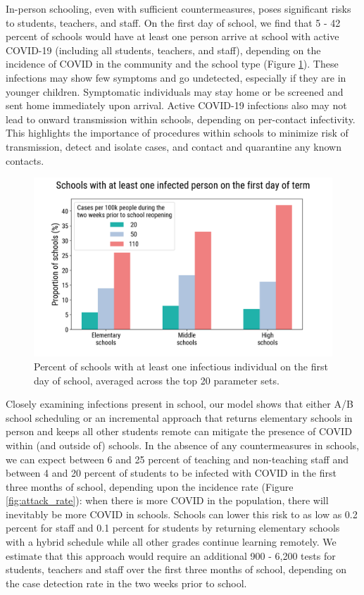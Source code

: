 \documentclass[preprint,12pt]{elsarticle}
\begin{document}
In-person schooling, even with sufficient countermeasures, poses significant risks to students, teachers, and staff. On the first day of school, we find that 5 - 42 percent of schools would have at least one person arrive at school with active COVID-19 (including all students, teachers, and staff), depending on the incidence of COVID in the community and the school type (Figure \ref{fig:schools_with_a_case}). These infections may show few symptoms and go undetected, especially if they are in younger children. Symptomatic individuals may stay home or be screened and sent home immediately upon arrival. Active COVID-19 infections also may not lead to onward transmission within schools, depending on per-contact infectivity. This highlights the importance of procedures within schools to minimize risk of transmission, detect and isolate cases, and contact and quarantine any known contacts. 

\begin{figure}[h]
    \centering
    \includegraphics[scale=0.5]{schools_with_a_case_2020-08-05.png}
    \caption{Percent of schools with at least one infectious individual on the first day of school, averaged across the top 20 parameter sets.}
    \label{fig:schools_with_a_case}
\end{figure}

Closely examining infections present in school, our model shows that either A/B school scheduling or an incremental approach that returns elementary schools in person and keeps all other students remote can mitigate the presence of COVID within (and outside of) schools. In the absence of any countermeasures in schools, we can expect between 6 and 25 percent of teaching and non-teaching staff and between 4 and 20 percent of students to be infected with COVID in the first three months of school, depending upon the incidence rate (Figure \ref{fig:attack_rate}): when there is more COVID in the population, there will inevitably be more COVID in schools. Schools can lower this risk to as low as 0.2 percent for staff and 0.1 percent for students by returning elementary schools with a hybrid schedule while all other grades continue learning remotely. We estimate that this approach would require an additional 900 - 6,200 tests for students, teachers and staff over the first three months of school, depending on the case detection rate in the two weeks prior to school.
\end{document}
